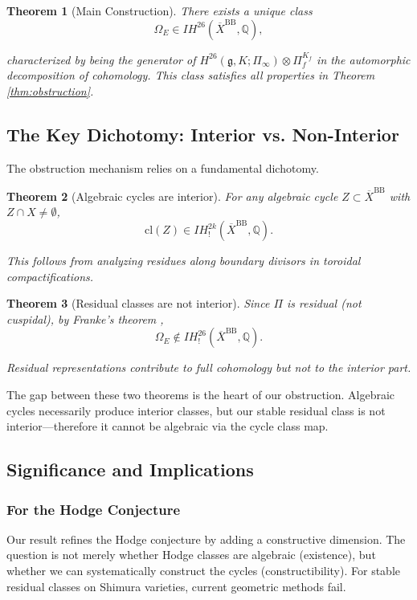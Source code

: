 \documentclass[12pt]{amsart}
\newtheorem{theorem}{Theorem}[section]
\theoremstyle{definition}
\newcommand{\Q}{\mathbb{Q}}
\newcommand{\IH}{\mathit{IH}}
\begin{document}
\begin{theorem}[Main Construction]
There exists a unique class
$$\Omega_E \in \IH^{26}(\overline{X}^{\mathrm{BB}}, \Q),$$

characterized by being the generator of $H^{26}(\mathfrak{g}, K; \Pi_\infty) \otimes \Pi_f^{K_f}$ in the automorphic decomposition of cohomology. This class satisfies all properties in Theorem \ref{thm:obstruction}.
\end{theorem}

\subsection{The Key Dichotomy: Interior vs. Non-Interior}

The obstruction mechanism relies on a fundamental dichotomy.

\begin{theorem}[Algebraic cycles are interior]
For any algebraic cycle $Z \subset \overline{X}^{\mathrm{BB}}$ with $Z \cap X \neq \emptyset$,
$$\mathrm{cl}(Z) \in \IH^{2k}_!(\overline{X}^{\mathrm{BB}}, \Q).$$

This follows from analyzing residues along boundary divisors in toroidal compactifications.
\end{theorem}

\begin{theorem}[Residual classes are not interior]
Since $\Pi$ is residual (not cuspidal), by Franke's theorem \cite{Franke}, 
$$\Omega_E \notin \IH^{26}_!(\overline{X}^{\mathrm{BB}}, \Q).$$

Residual representations contribute to full cohomology but not to the interior part.
\end{theorem}

The gap between these two theorems is the heart of our obstruction. Algebraic cycles necessarily produce interior classes, but our stable residual class is not interior---therefore it cannot be algebraic via the cycle class map.

\subsection{Significance and Implications}

\subsubsection{For the Hodge Conjecture}

Our result refines the Hodge conjecture by adding a constructive dimension. The question is not merely whether Hodge classes are algebraic (existence), but whether we can systematically construct the cycles (constructibility). For stable residual classes on Shimura varieties, current geometric methods fail.
\end{document}
